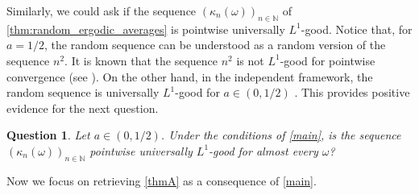 \documentclass[11pt]{amsart}
\numberwithin{equation}{section}
\newtheorem{question}{Question}
\theoremstyle{definition}
\theoremstyle{plain}
\newcommand{\N}{{\mathbb N}}
\begin{document}
Similarly, we could ask if the sequence $(\kappa_n(\omega))_{n\in\N}$ of \cref{thm:random_ergodic_averages} is pointwise universally $L^1$-good. Notice that, for $a=1/2$, the random sequence can be understood as a random version of the sequence $n^2$. It is known that the sequence $n^2$ is not $L^1$-good for pointwise convergence (see \cite{Buczolich_Mauldin, Buczolich_Mauldin_2}). On the other hand, in the independent framework, the random sequence is universally $L^1$-good for $a\in (0,1/2)$ \cite{LaVictoire}. This provides positive evidence for the next question. 

\begin{question}
    Let $a\in (0,1/2)$. Under the conditions of \cref{main}, is the sequence $(\kappa_n(\omega))_{n\in\N}$ pointwise universally $L^1$-good for almost every $\omega$?
\end{question}

Now we focus on retrieving \cref{thmA} as a consequence of \cref{main}.
\end{document}
